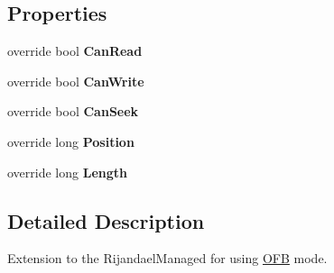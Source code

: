 \subsection*{Properties}
\begin{DoxyCompactItemize}
\item 
\mbox{\label{class_b_s_k___encryption_1_1_encryption_1_1_o_f_b_1_1_o_f_b_stream_a3218b3890ff3cab4edccd36a77b8189c}} 
override bool {\bfseries Can\+Read}
\item 
\mbox{\label{class_b_s_k___encryption_1_1_encryption_1_1_o_f_b_1_1_o_f_b_stream_acff50613f8ea2e3276a2600a68074b92}} 
override bool {\bfseries Can\+Write}
\item 
\mbox{\label{class_b_s_k___encryption_1_1_encryption_1_1_o_f_b_1_1_o_f_b_stream_afef125ad81425e51e1baf67447841abf}} 
override bool {\bfseries Can\+Seek}
\item 
\mbox{\label{class_b_s_k___encryption_1_1_encryption_1_1_o_f_b_1_1_o_f_b_stream_a829cfc75724edfe38e2c5c8c007a1724}} 
override long {\bfseries Position}
\item 
\mbox{\label{class_b_s_k___encryption_1_1_encryption_1_1_o_f_b_1_1_o_f_b_stream_aa9ecacc52e2274164d959ee66901788b}} 
override long {\bfseries Length}
\end{DoxyCompactItemize}


\subsection{Detailed Description}
Extension to the Rijandael\+Managed for using \mbox{\hyperlink{namespace_b_s_k___encryption_1_1_encryption_1_1_o_f_b}{O\+FB}} mode. 



